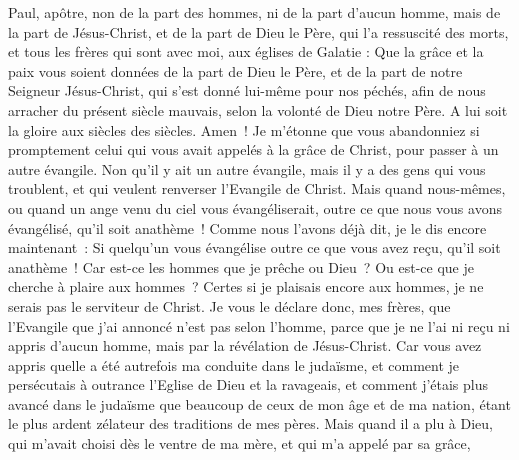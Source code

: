 \begin{multicols}{2}
\VerseOne{}Paul, apôtre, non de la part des hommes, ni de la part d'aucun homme, mais de la part de Jésus-Christ, et de la part de Dieu le Père, qui l'a ressuscité des morts,
et tous les frères qui sont avec moi, aux églises de Galatie :
Que la grâce et la paix vous soient données de la part de Dieu le Père, et de la part de notre Seigneur Jésus-Christ,
qui s'est donné lui-même pour nos péchés, afin de nous arracher du présent siècle mauvais, selon la volonté de Dieu notre Père.
A lui soit la gloire aux siècles des siècles. Amen~!
Je m'étonne que vous abandonniez si promptement celui qui vous avait appelés à la grâce de Christ, pour passer à un autre évangile. 
Non qu'il y ait un autre évangile, mais il y a des gens qui vous troublent, et qui veulent renverser l'Evangile de Christ.
Mais quand nous-mêmes, ou quand un ange venu du ciel vous évangéliserait, outre ce que nous vous avons évangélisé, qu'il soit anathème~!
Comme nous l'avons déjà dit, je le dis encore maintenant~: Si quelqu'un vous évangélise outre ce que vous avez reçu, qu'il soit anathème~!
Car est-ce les hommes que je prêche ou Dieu~? Ou est-ce que je cherche à plaire aux hommes~? Certes si je plaisais encore aux hommes, je ne serais pas le serviteur de Christ.
Je vous le déclare donc, mes frères, que l'Evangile que j'ai annoncé n'est pas selon l'homme,
parce que je ne l'ai ni reçu ni appris d'aucun homme, mais par la révélation de Jésus-Christ.
Car vous avez appris quelle a été autrefois ma conduite dans le judaïsme, et comment je persécutais à outrance l'Eglise de Dieu et la ravageais,
et comment j'étais plus avancé dans le judaïsme que beaucoup de ceux de mon âge et de ma nation, étant le plus ardent zélateur des traditions de mes pères.
Mais quand il a plu à Dieu, qui m'avait choisi dès le ventre de ma mère, et qui m'a appelé par sa grâce,

\end{multicols}
